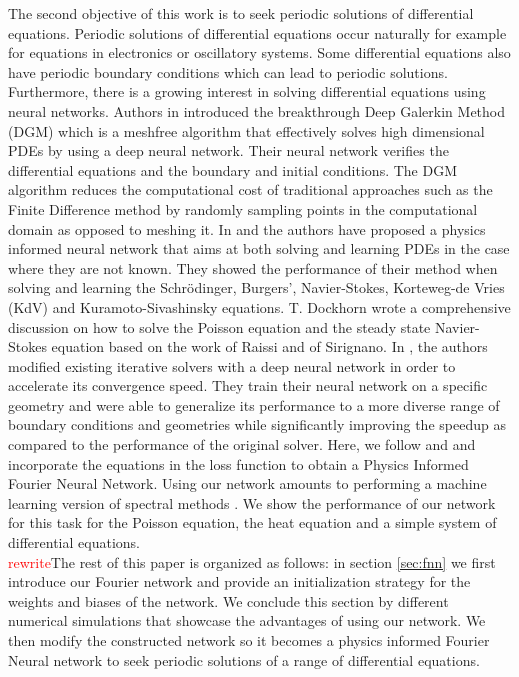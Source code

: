 \documentclass[AMS,STIX1COL]{WileyNJD-v2}
\begin{document}
The second objective of this work is to seek periodic solutions of differential equations. Periodic solutions of differential equations occur naturally for example for equations in electronics or oscillatory systems. Some differential equations also have periodic boundary conditions which can lead to periodic solutions. Furthermore, there is a growing interest in solving differential equations using neural networks. Authors in \cite{Sirignano} introduced the breakthrough Deep Galerkin Method (DGM) which is a meshfree algorithm that effectively solves high dimensional PDEs by using a deep neural network. Their neural network verifies the differential equations and the boundary and initial conditions. The DGM algorithm reduces the computational cost of traditional approaches such as the Finite Difference method by randomly sampling points in the computational domain as opposed to meshing it. In \cite{raissi2017hidden} and \cite{Raissi} the authors have proposed a physics informed neural network that aims at both solving and learning PDEs in the case where they are not known. They showed the performance of their method when solving and learning the Schrödinger, Burgers', Navier-Stokes, Korteweg-de Vries (KdV) and Kuramoto-Sivashinsky equations. T. Dockhorn \cite{Dockhorn} wrote a comprehensive discussion on how to solve the Poisson equation and the steady state Navier-Stokes equation based on the work of Raissi and of Sirignano. In \cite{hsieh2019learning}, the authors modified existing iterative solvers with a deep neural network in order to accelerate its convergence speed. They train their neural network on a specific geometry and were able to generalize its performance to a more diverse range of boundary conditions and geometries while significantly improving the speedup as compared to the performance of the original solver. Here, we follow \cite{Raissi} and \cite{Sirignano} and incorporate the equations in the loss function to obtain a Physics Informed Fourier Neural Network. Using our network amounts to performing a machine learning version of spectral methods \cite{Trefethen2000}. We show the performance of our network for this task for the Poisson equation, the heat equation and a simple system of differential equations.\\

\textcolor{red}{rewrite}The rest of this paper is organized as follows: in section \ref{sec:fnn} we first introduce our Fourier network and provide an initialization strategy for the weights and biases of the network. We conclude this section by different numerical simulations that showcase the advantages of using our network. We then modify the constructed network so it becomes a physics informed Fourier Neural network to seek periodic solutions of a range of differential equations. 
\end{document}
